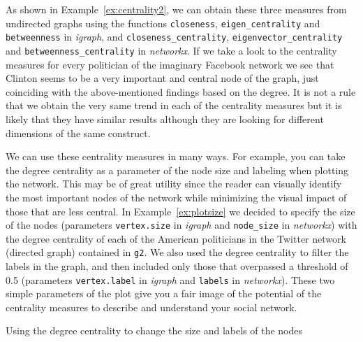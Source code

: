 As shown in Example~\ref{ex:centrality2}, we can obtain these three measures from undirected graphs using the functions \texttt{closeness}, \texttt{eigen\_centrality} and \texttt{betweenness} in \emph{igraph}, and \texttt{closeness\_centrality}, \texttt{eigenvector\_centrality} and \texttt{betweenness\_centrality} in \emph{networkx}. If we take a look to the centrality measures for every politician of the imaginary Facebook network we see that Clinton seems to be a very important and central node of the graph, just coinciding with the above-mentioned findings based on the degree. It is not a rule that we obtain the very same trend in each of the centrality measures but it is likely that they have similar results although they are looking for different dimensions of the same construct.


We can use these centrality measures in many ways. For example, you can take the degree centrality as a parameter of the node size and labeling when plotting the network. This may be of great utility since the reader can visually identify the most important nodes of the network while minimizing the visual impact of those that are less central. In Example~\ref{ex:plotsize} we decided to specify the size of the nodes (parameters \verb|vertex.size| in \emph{igraph} and \verb|node_size| in \emph{networkx}) with the degree centrality of each of the American politicians in the Twitter network (directed graph) contained in \texttt{g2}. We also used the degree centrality to filter the labels in the graph, and then included only those that overpassed a threshold of 0.5 (parameters \verb|vertex.label| in \emph{igraph} and \verb|labels| in \emph{networkx}). These two simple parameters of the plot give you a fair image of the potential of the centrality measures to describe and understand your social network.

\begin{ccsexample}
  \caption{Using the degree centrality to change the size and labels of the nodes}
  \label{ex:plotsize}
\end{ccsexample}

